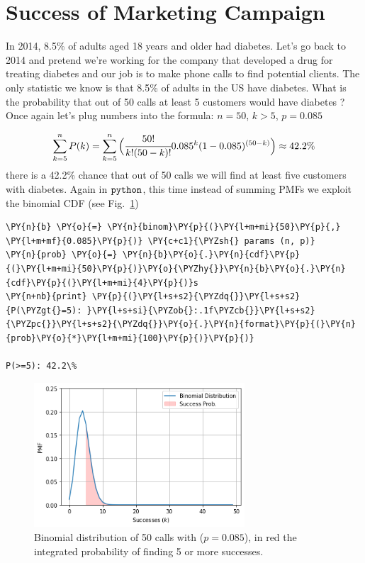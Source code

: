 \section{Success of Marketing Campaign}\label{success-of-marketing-campaign}

In 2014, 8.5\% of adults aged 18 years and older had diabetes. Let's go
back to 2014 and pretend we're working for the company that developed a
drug for treating diabetes and our job is to make phone calls to find
potential clients. The only statistic we know is that 8.5\% of adults in
the US have diabetes. What is the probability that out of 50 calls at
least 5 customers would have diabetes ? Once again let's plug numbers
into the formula: \(n = 50\), \(k > 5\), \(p = 0.085\)

\[\sum_{k=5}^{n}P(k) = \sum_{k=5}^{n}\Big(\cfrac{50!}{k!(50 - k)!}0.085^{k}(1-0.085)^{(50-k)}\Big) \approx 42.2\% \]
there is a 42.2\% chance that out of 50 calls we will find at least five
customers with diabetes. Again in \(\tt{python}\), this time instead of
summing PMFs we exploit the binomial CDF (see Fig.~\ref{fig:binomial_cdf})

\begin{codebox}
\begin{Verbatim}[commandchars=\\\{\}]
\PY{n}{b} \PY{o}{=} \PY{n}{binom}\PY{p}{(}\PY{l+m+mi}{50}\PY{p}{,} \PY{l+m+mf}{0.085}\PY{p}{)} \PY{c+c1}{\PYZsh{} params (n, p)}
\PY{n}{prob} \PY{o}{=} \PY{n}{b}\PY{o}{.}\PY{n}{cdf}\PY{p}{(}\PY{l+m+mi}{50}\PY{p}{)}\PY{o}{\PYZhy{}}\PY{n}{b}\PY{o}{.}\PY{n}{cdf}\PY{p}{(}\PY{l+m+mi}{4}\PY{p}{)}s
\PY{n+nb}{print} \PY{p}{(}\PY{l+s+s2}{\PYZdq{}}\PY{l+s+s2}{P(\PYZgt{}=5): }\PY{l+s+si}{\PYZob{}:.1f\PYZcb{}}\PY{l+s+s2}{\PYZpc{}}\PY{l+s+s2}{\PYZdq{}}\PY{o}{.}\PY{n}{format}\PY{p}{(}\PY{n}{prob}\PY{o}{*}\PY{l+m+mi}{100}\PY{p}{)}\PY{p}{)}

P(>=5): 42.2\%
\end{Verbatim}
\end{codebox}

    \begin{figure}[htb]
    \centering
    \includegraphics[width=0.7\textwidth]{figures/binomial_5_0.png}
    \caption{Binomial distribution of 50 calls with ($p=0.085$), in red the integrated probability of finding 5 or more successes.}
    \label{fig:binomial_cdf}
    \end{figure}
    